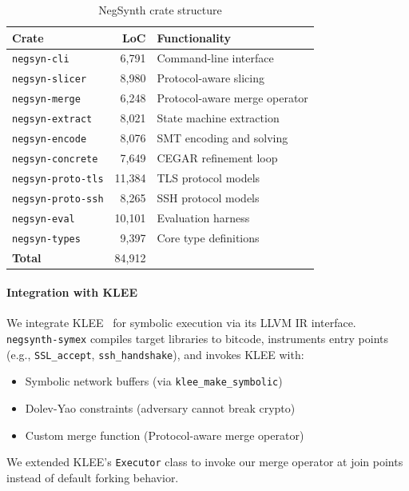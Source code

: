 \documentclass[10pt,twocolumn]{article}
\begin{document}
\begin{table}[t]
\centering
\caption{NegSynth crate structure}
\label{tab:crates}
\begin{tabular}{lrp{4cm}}
\toprule
\textbf{Crate} & \textbf{LoC} & \textbf{Functionality} \\
\midrule
\texttt{negsyn-cli} & 6,791 & Command-line interface \\
\texttt{negsyn-slicer} & 8,980 & Protocol-aware slicing \\
\texttt{negsyn-merge} & 6,248 & Protocol-aware merge operator \\
\texttt{negsyn-extract} & 8,021 & State machine extraction \\
\texttt{negsyn-encode} & 8,076 & SMT encoding and solving \\
\texttt{negsyn-concrete} & 7,649 & CEGAR refinement loop \\
\texttt{negsyn-proto-tls} & 11,384 & TLS protocol models \\
\texttt{negsyn-proto-ssh} & 8,265 & SSH protocol models \\
\texttt{negsyn-eval} & 10,101 & Evaluation harness \\
\texttt{negsyn-types} & 9,397 & Core type definitions \\
\midrule
\textbf{Total} & 84,912 & \\
\bottomrule
\end{tabular}
\end{table}

\paragraph{Integration with KLEE}
We integrate KLEE~\cite{cadar2008klee} for symbolic execution via its LLVM IR interface. \texttt{negsynth-symex} compiles target libraries to bitcode, instruments entry points (e.g., \texttt{SSL\_accept}, \texttt{ssh\_handshake}), and invokes KLEE with:
\begin{itemize}[leftmargin=*,noitemsep]
\item Symbolic network buffers (via \texttt{klee\_make\_symbolic})
\item Dolev-Yao constraints (adversary cannot break crypto)
\item Custom merge function (Protocol-aware merge operator)
\end{itemize}

We extended KLEE's \texttt{Executor} class to invoke our merge operator at join points instead of default forking behavior.
\end{document}
